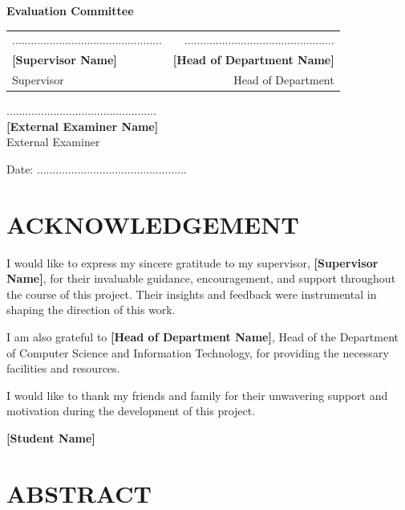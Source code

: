 \documentclass[12pt, a4paper]{report}
\begin{document}
\vspace{1.5cm}

\noindent \textbf{Evaluation Committee}

\vspace{1cm}

\noindent 
\begin{tabular}{lr}
................................................ & ................................................ \\
\textbf{[Supervisor Name]} & \textbf{[Head of Department Name]} \\
Supervisor & Head of Department \\
\end{tabular}

\vspace{1.5cm}

\noindent ................................................ \\
\textbf{[External Examiner Name]} \\
External Examiner

\vspace{0.5cm}

\noindent Date: ................................................


\newpage
\chapter*{ACKNOWLEDGEMENT}

I would like to express my sincere gratitude to my supervisor, \textbf{[Supervisor Name]}, for their invaluable guidance, encouragement, and support throughout the course of this project. Their insights and feedback were instrumental in shaping the direction of this work.

I am also grateful to \textbf{[Head of Department Name]}, Head of the Department of Computer Science and Information Technology, for providing the necessary facilities and resources.

I would like to thank my friends and family for their unwavering support and motivation during the development of this project.

\vspace{1cm}

\noindent \textbf{[Student Name]} \\
[Date]


\newpage
\chapter*{ABSTRACT}
\end{document}
